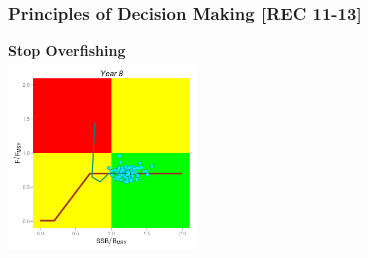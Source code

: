 \begin{frame}\frametitle{Principles of Decision Making [REC 11-13]} \smallskip\textbf{Stop Overfishing}\smallskip\\ \includegraphics[height=50mm,width=50mm]{hcrI9.png}\end{frame}

